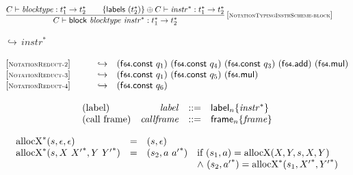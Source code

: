 $$
\begin{array}{@{}c@{}}\displaystyle
\frac{
C \vdash {\mathit{blocktype}} : {t_1^\ast} \rightarrow {t_2^\ast}
 \qquad
\{ \mathsf{labels}~({t_2^\ast}) \} \oplus C \vdash {{\mathit{instr}}^\ast} : {t_1^\ast} \rightarrow {t_2^\ast}
}{
C \vdash \mathsf{block}~{\mathit{blocktype}}~{{\mathit{instr}}^\ast} : {t_1^\ast} \rightarrow {t_2^\ast}
} \, {[\textsc{\scriptsize NotationTypingInstrScheme{-}block}]}
\qquad
\end{array}
$$

\vspace{1ex}

$\boxed{{\hookrightarrow}\, {{\mathit{instr}}^\ast}}$

$$
\begin{array}[t]{@{}lrcl@{}l@{}}
{[\textsc{\scriptsize NotationReduct{-}2}]} \quad & & \hookrightarrow & (\mathsf{f{\scriptstyle 64}}{.}\mathsf{const}~q_1)~(\mathsf{f{\scriptstyle 64}}{.}\mathsf{const}~q_4)~(\mathsf{f{\scriptstyle 64}}{.}\mathsf{const}~q_3)~(\mathsf{f{\scriptstyle 64}} {.} \mathsf{add})~(\mathsf{f{\scriptstyle 64}} {.} \mathsf{mul}) \\
{[\textsc{\scriptsize NotationReduct{-}3}]} \quad & & \hookrightarrow & (\mathsf{f{\scriptstyle 64}}{.}\mathsf{const}~q_1)~(\mathsf{f{\scriptstyle 64}}{.}\mathsf{const}~q_5)~(\mathsf{f{\scriptstyle 64}} {.} \mathsf{mul}) \\
{[\textsc{\scriptsize NotationReduct{-}4}]} \quad & & \hookrightarrow & (\mathsf{f{\scriptstyle 64}}{.}\mathsf{const}~q_6) \\
\end{array}
$$

\vspace{1ex}

$$
\begin{array}[t]{@{}lrrl@{}l@{}}
\mbox{(label)} & {\mathit{label}} & ::= & {{\mathsf{label}}_{n}}{\{ {{\mathit{instr}}^\ast} \}} \\
\mbox{(call frame)} & {\mathit{callframe}} & ::= & {{\mathsf{frame}}_{n}}{\{ {\mathit{frame}} \}} \\
\end{array}
$$

\vspace{1ex}

$$
\begin{array}[t]{@{}lcl@{}l@{}}
{{{\mathrm{allocX}}^\ast}}{(s, \epsilon, \epsilon)} & = & (s, \epsilon) \\
{{{\mathrm{allocX}}^\ast}}{(s, X~{{X'}^\ast}, Y~{{Y'}^\ast})} & = & (s_2, a~{{a'}^\ast}) & \quad
\begin{array}[t]{@{}l@{}}
\mbox{if}~ (s_1, a) = {\mathrm{allocX}}(X, Y, s, X, Y) \\
{\land}~ (s_2, {{a'}^\ast}) = {{{\mathrm{allocX}}^\ast}}{(s_1, {{X'}^\ast}, {{Y'}^\ast})} \\
\end{array} \\
\end{array}
$$


